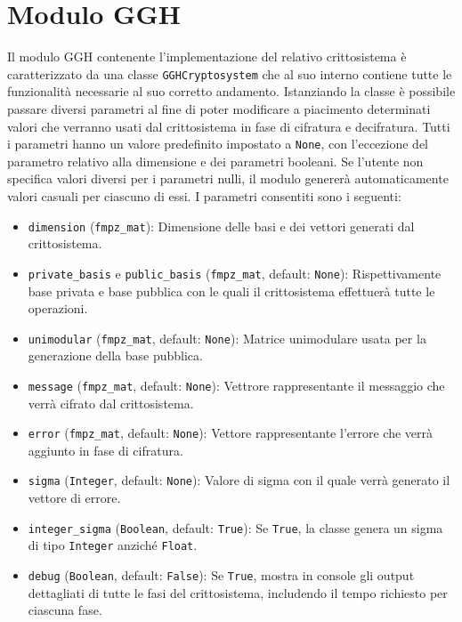 \section{Modulo GGH}
\label{sec:moduloggh}

Il modulo GGH contenente l'implementazione del relativo crittosistema è caratterizzato
da una classe \texttt{GGHCryptosystem} che al suo interno contiene tutte le funzionalità
necessarie al suo corretto andamento. Istanziando la classe è possibile passare 
diversi parametri al fine di poter modificare a piacimento determinati valori 
che verranno usati dal crittosistema in fase di cifratura e decifratura.
Tutti i parametri hanno un valore predefinito impostato a \texttt{None}, con l'eccezione del 
parametro relativo alla dimensione e dei parametri booleani. 
Se l'utente non specifica valori diversi per i parametri nulli, il modulo genererà automaticamente valori casuali per ciascuno 
di essi. I parametri consentiti sono i seguenti:
\begin{itemize}
    \item \texttt{dimension} (\texttt{fmpz\_mat}): 
    Dimensione delle basi e dei vettori generati dal crittosistema.
    \item \texttt{private\_basis} e \texttt{public\_basis} (\texttt{fmpz\_mat}, default: \texttt{None}): 
    Rispettivamente base privata e base pubblica con le quali il crittosistema effettuerà 
    tutte le operazioni.
    \item \texttt{unimodular} (\texttt{fmpz\_mat}, default: \texttt{None}):
    Matrice unimodulare usata per la generazione della base pubblica. 
    \item \texttt{message} (\texttt{fmpz\_mat}, default: \texttt{None}): 
    Vettrore rappresentante il messaggio che verrà cifrato dal crittosistema.
    \item \texttt{error} (\texttt{fmpz\_mat}, default: \texttt{None}): 
    Vettore rappresentante l'errore che verrà aggiunto in fase di cifratura.
    \item \texttt{sigma} (\texttt{Integer}, default: \texttt{None}): 
    Valore di sigma con il quale verrà generato il vettore di errore. 
    \item \texttt{integer\_sigma} (\texttt{Boolean}, default: \texttt{True}):
    Se \texttt{True}, la classe genera un sigma di tipo \texttt{Integer} anziché \texttt{Float}.
    \item \texttt{debug} (\texttt{Boolean}, default: \texttt{False}):
    Se \texttt{True}, mostra in console gli output dettagliati di tutte le fasi del 
    crittosistema, includendo il tempo richiesto per ciascuna fase. 
\end{itemize}

